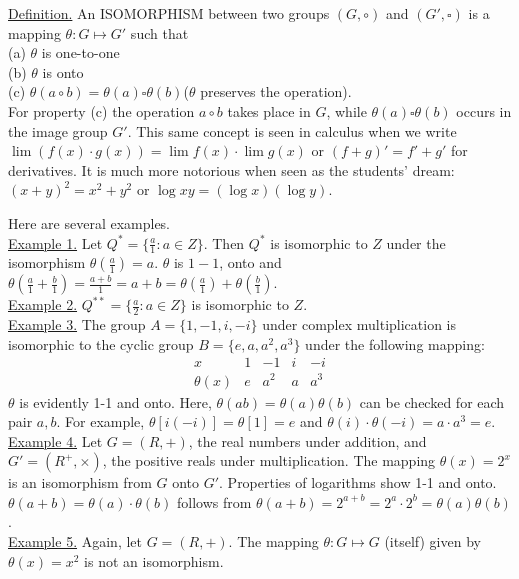 \documentclass[12pt]{article}
\theoremstyle{definition}
\begin{document}
\underline{Definition.} An ISOMORPHISM between two groups $(G,\circ)$ and $(G',\square)$ is a mapping $\theta:G\mapsto G'$ such that\\
(a) $\theta$ is one-to-one\\
(b) $\theta$ is onto\\
(c) $\theta(a\circ b)=\theta(a)\square\theta(b)$\quad($\theta$ preserves the operation).\\
For property (c) the operation $a\circ b$ takes place in $G$, while $\theta(a)\square\theta(b)$ occurs in the image group $G'$.  This same concept is seen in calculus when we write $\lim(f(x)\cdot g(x)) = \lim f(x)\cdot \lim g(x)$ or $(f+g)'=f'+g'$ for derivatives.  It is much more notorious when seen as the students' dream: $(x+y)^2=x^2+y^2$ or $\log xy =(\log x)(\log y)$.

Here are several examples.\\
\underline{Example 1.} Let $Q^*=\{\frac{a}{1}:a\in Z\}$.  Then $Q^*$ is isomorphic to $Z$ under the isomorphism $\theta(\frac{a}{1})=a$.  $\theta$ is $1-1$, onto and $\theta(\frac{a}{1}+\frac{b}{1})=\frac{a+b}{1}=a+b=\theta(\frac{a}{1})+\theta(\frac{b}{1})$.\\[.1in]
\underline{Example 2.} $Q^{**}=\{\frac{a}{2}:a\in Z\}$ is isomorphic to $Z$.\\[.1in]
\underline{Example 3.} The group $A=\{1,-1,i,-i\}$ under complex multiplication is isomorphic to the cyclic group $B=\{e,a,a^2,a^3\} $ under the following mapping:
$$\begin{array}{c|cccc}
x&1&-1&i&-i\\
\hline
\theta(x)&e&a^2&a&a^3
\end{array}$$
$\theta$ is evidently 1-1 and onto.  Here, $\theta(ab)=\theta(a)\theta(b)$ can be checked for each pair $a,b$.  For example, $\theta[i(-i)]=\theta[1]=e$ and $\theta(i)\cdot\theta(-i)=a\cdot a^3=e$.\\[.1in]
\underline{Example 4.} Let $G=(R,+)$, the real numbers under addition, and $G'=(R^+,\times)$, the positive reals under multiplication.  The mapping $\theta(x)=2^x$ is an isomorphism from $G$ onto $G'$.  Properties of logarithms show 1-1 and onto.  $\theta(a+b)=\theta(a)\cdot\theta(b)$ follows from $\theta(a+b)=2^{a+b}=2^a\cdot2^b = \theta(a)\theta(b)$.\\[.1in]
\underline{Example 5.} Again, let $G=(R,+)$. The mapping $\theta:G\mapsto G$ (itself) given by $\theta(x)=x^2$ is not an isomorphism.
\end{document}
